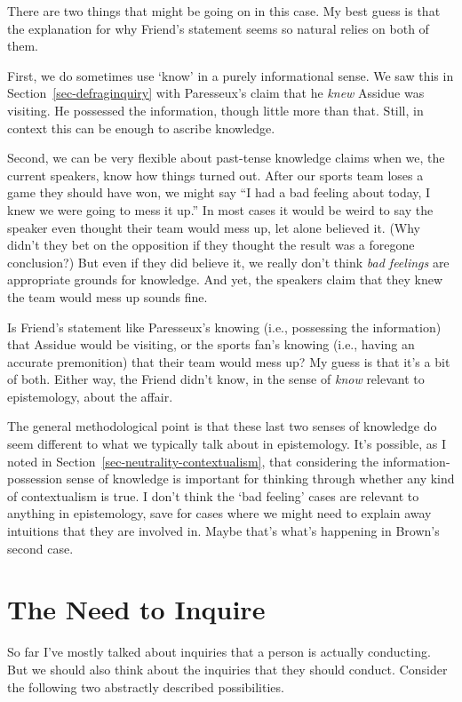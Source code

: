 \documentclass[
  10pt,
  letterpaper,
  twoside]{scrbook}
\begin{document}
There are two things that might be going on in this case. My best guess
is that the explanation for why Friend's statement seems so natural
relies on both of them.

First, we do sometimes use `know' in a purely informational sense. We
saw this in Section~\ref{sec-defraginquiry} with Paresseux's claim that
he \emph{knew} Assidue was visiting. He possessed the information,
though little more than that. Still, in context this can be enough to
ascribe knowledge.

Second, we can be very flexible about past-tense knowledge claims when
we, the current speakers, know how things turned out. After our sports
team loses a game they should have won, we might say ``I had a bad
feeling about today, I knew we were going to mess it up.'' In most cases
it would be weird to say the speaker even thought their team would mess
up, let alone believed it. (Why didn't they bet on the opposition if
they thought the result was a foregone conclusion?) But even if they did
believe it, we really don't think \emph{bad feelings} are appropriate
grounds for knowledge. And yet, the speakers claim that they knew the
team would mess up sounds fine.

Is Friend's statement like Paresseux's knowing (i.e., possessing the
information) that Assidue would be visiting, or the sports fan's knowing
(i.e., having an accurate premonition) that their team would mess up? My
guess is that it's a bit of both. Either way, the Friend didn't know, in
the sense of \emph{know} relevant to epistemology, about the affair.

The general methodological point is that these last two senses of
knowledge do seem different to what we typically talk about in
epistemology. It's possible, as I noted in
Section~\ref{sec-neutrality-contextualism}, that considering the
information-possession sense of knowledge is important for thinking
through whether any kind of contextualism is true. I don't think the
`bad feeling' cases are relevant to anything in epistemology, save for
cases where we might need to explain away intuitions that they are
involved in. Maybe that's what's happening in Brown's second case.

\section{The Need to Inquire}\label{sec-need}

So far I've mostly talked about inquiries that a person is actually
conducting. But we should also think about the inquiries that they
should conduct. Consider the following two abstractly described
possibilities.
\end{document}
